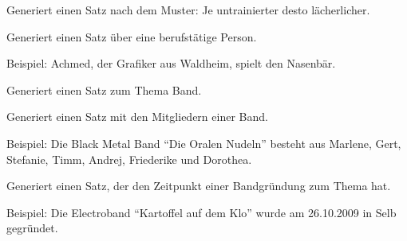 \documentclass[a4paper,12pt,oneside]{sphinxmanual}
\begin{document}

\begin{fulllineitems}
\label{module:pyzufall.satz.satz_adjektiv_sprichwort}
Generiert einen Satz nach dem Muster: Je untrainierter desto lächerlicher.

\end{fulllineitems}


\begin{fulllineitems}
\label{module:pyzufall.satz.satz_arbeit}
Generiert einen Satz über eine berufstätige Person.

Beispiel: Achmed, der Grafiker aus Waldheim, spielt den Nasenbär.

\end{fulllineitems}


\begin{fulllineitems}
\label{module:pyzufall.satz.satz_band}
Generiert einen Satz zum Thema Band.

\end{fulllineitems}


\begin{fulllineitems}
\label{module:pyzufall.satz.satz_band_besetzung}
Generiert einen Satz mit den Mitgliedern einer Band.

Beispiel: Die Black Metal Band ``Die Oralen Nudeln'' besteht aus Marlene, Gert, Stefanie, Timm, Andrej, Friederike und Dorothea.

\end{fulllineitems}


\begin{fulllineitems}
\label{module:pyzufall.satz.satz_band_gegruendet}
Generiert einen Satz, der den Zeitpunkt einer Bandgründung zum Thema hat.

Beispiel: Die Electroband ``Kartoffel auf dem Klo'' wurde am 26.10.2009 in Selb gegründet.

\end{fulllineitems}
\end{document}
